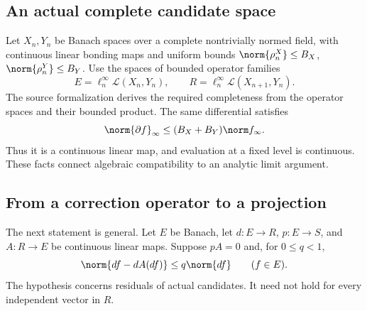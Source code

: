 \label{sec:split}
\subsection{An actual complete candidate space}
Let \(X_n,Y_n\) be Banach spaces over a complete nontrivially normed field, with continuous linear bonding maps and uniform bounds \(\norm{\rho^X_n}\le B_X\), \(\norm{\rho^Y_n}\le B_Y\). Use the spaces of bounded operator families
\[
 E=\ell^\infty_n\mathcal L(X_n,Y_n),\qquad
 R=\ell^\infty_n\mathcal L(X_{n+1},Y_n).
\]
The source formalization derives the required completeness from the operator spaces and their bounded product. The same differential satisfies
\[
 \norm{\partial f}_\infty\le(B_X+B_Y)\norm f_\infty.
\]
Thus it is a continuous linear map, and evaluation at a fixed level is continuous. These facts connect algebraic compatibility to an analytic limit argument.

\subsection{From a correction operator to a projection}
The next statement is general. Let \(E\) be Banach, let \(d:E\to R\), \(p:E\to S\), and \(A:R\to E\) be continuous linear maps. Suppose \(pA=0\) and, for \(0\le q<1\),
\begin{equation}\label{eq:contraction}
 \norm{df-dA(df)}\le q\norm{df}\qquad(f\in E).
\end{equation}
The hypothesis concerns residuals of actual candidates. It need not hold for every independent vector in \(R\).

